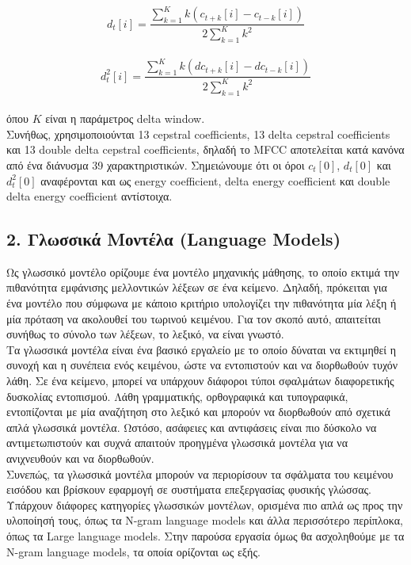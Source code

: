 \documentclass{article}
\begin{document}
\\[1.5mm]
\[d_t[i] = \frac{\sum_{k=1}^{K} k \left(c_{t+k}[i] - c_{t-k}[i]\right)}{2 \sum_{k=1}^{K} k^2}\]
\\[1.5mm]
\[d_{t}^2[i] = \frac{\sum_{k=1}^{K} k \left(d c_{t+k}[i] - d c_{t-k}[i]\right)}{2 \sum_{k=1}^{K} k^2}\]
\\[1.5mm]
όπου $K$ είναι η παράμετρος delta window.
\\[1.5mm]
Συνήθως, χρησιμοποιούνται 13 cepstral coefficients, 13 delta cepstral coefficients και 13 double delta cepstral coefficients, δηλαδή το MFCC αποτελείται κατά κανόνα από ένα διάνυσμα 39 χαρακτηριστικών. Σημειώνουμε ότι οι όροι $c_t[0]$, $d_t[0]$ και $d_{t}^2[0]$ αναφέρονται και ως energy coefficient, delta energy coefficient και double delta energy coefficient αντίστοιχα.
%
%
%
%
\subsection*{2. Γλωσσικά Μοντέλα (Language Models)}
Ως γλωσσικό μοντέλο ορίζουμε ένα μοντέλο μηχανικής μάθησης, το οποίο εκτιμά την πιθανότητα εμφάνισης μελλοντικών λέξεων σε ένα κείμενο. Δηλαδή, πρόκειται για ένα μοντέλο που σύμφωνα με κάποιο κριτήριο υπολογίζει την πιθανότητα μία λέξη ή μία πρόταση να ακολουθεί του τωρινού κειμένου. Για τον σκοπό αυτό, απαιτείται συνήθως το σύνολο των λέξεων, το λεξικό, να είναι γνωστό.
\\[1.5mm]
Τα γλωσσικά μοντέλα είναι ένα βασικό εργαλείο με το οποίο δύναται να εκτιμηθεί η συνοχή και η συνέπεια ενός κειμένου, ώστε να εντοπιστούν και να διορθωθούν τυχόν λάθη. Σε ένα κείμενο, μπορεί να υπάρχουν διάφοροι τύποι σφαλμάτων διαφορετικής δυσκολίας εντοπισμού. Λάθη γραμματικής, ορθογραφικά και τυπογραφικά, εντοπίζονται με μία αναζήτηση στο λεξικό και μπορούν να διορθωθούν από σχετικά απλά γλωσσικά μοντέλα. Ωστόσο, ασάφειες και αντιφάσεις είναι πιο δύσκολο να αντιμετωπιστούν και συχνά απαιτούν προηγμένα γλωσσικά μοντέλα για να ανιχνευθούν και να διορθωθούν.
\\[1.5mm]
Συνεπώς, τα γλωσσικά μοντέλα μπορούν να περιορίσουν τα σφάλματα του κειμένου εισόδου και βρίσκουν εφαρμογή σε συστήματα επεξεργασίας φυσικής γλώσσας.
\\[1.5mm]
\label{N-grams}
Υπάρχουν διάφορες κατηγορίες γλωσσικών μοντέλων, ορισμένα πιο απλά ως προς την υλοποίησή τους, όπως τα N-gram language models και άλλα περισσότερο περίπλοκα, όπως τα Large language models. Στην παρούσα εργασία όμως θα ασχοληθούμε με τα N-gram language models, τα οποία ορίζονται ως εξής.
\\[1.5mm]
\end{document}
